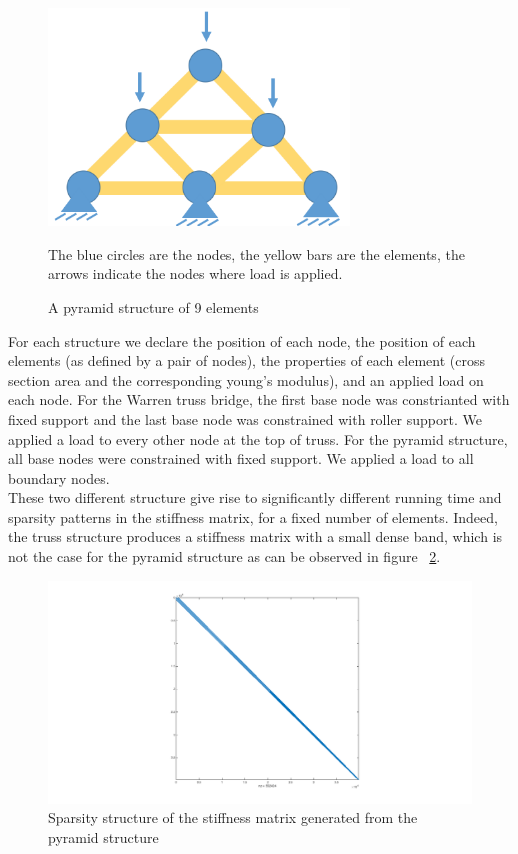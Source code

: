 \documentclass[11pt]{article}
\begin{document}
\begin{figure}[h]
\begin{center}

\includegraphics[width=8cm]{pyramid}
\caption{A pyramid structure of 9 elements}
\label{fig:pyramid}
The blue circles are the nodes, the yellow bars are the elements, the arrows indicate the nodes where load is applied.
\end{center}

\end{figure}


For each structure we declare the position of each node, the position of each elements (as defined by a pair of nodes), the properties of each element (cross section area and the corresponding young's modulus), and an applied load on each node. For the Warren truss bridge, the first base node was constrianted with fixed support and the last base node was constrained with roller support. We applied a load to every other node at the top of truss. For the pyramid structure, all base nodes were constrained with fixed support. We applied a load to all boundary nodes.\\

These two different structure give rise to significantly different running time and sparsity patterns in the stiffness matrix, for a fixed number of elements. Indeed, the truss structure produces a stiffness matrix with a small dense band, which is not the case for the pyramid structure  as can be observed in figure ~\ref{fig:pyramid-sparsity}.

\begin{figure}[H]
\begin{center}
\includegraphics[width=15cm]{pyramid-sparsity.png}
\caption{Sparsity structure of the stiffness matrix generated from the pyramid structure}
\label{fig:pyramid-sparsity}
\end{center}

\end{figure}
\end{document}
